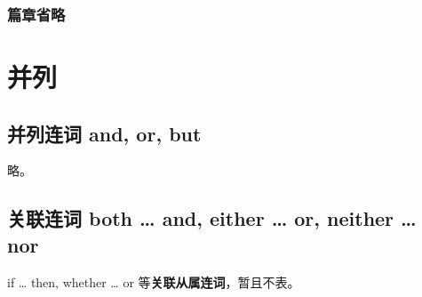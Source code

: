 \subsubsection{篇章省略}


\section{并列}
\subsection{并列连词 and, or, but}

略。

\subsection{关联连词 both \ldots{} and, either \ldots{} or, neither \ldots{}
  nor}

if \ldots{} then, whether \ldots{} or 等\textbf{关联从属连词}，暂且不表。

